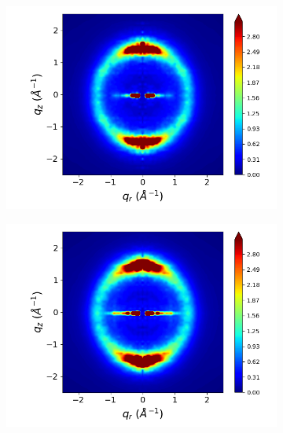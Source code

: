 \documentclass[journal=jpcbfk,manuscript=article]{achemso}
\begin{document}
\begin{figure}[!htb]
  \begin{subfigure}{0.3\linewidth}
  	\centering
  	\includegraphics[width=\textwidth]{rotated_monomers_rzplot_norestraints.png}
  	\caption{}\label{fig:rotated_monomers_rzplot_norestraints}
  \end{subfigure}
  \begin{subfigure}{0.3\linewidth}
  	\centering
  	\includegraphics[width=\textwidth]{staggered_rzplot_norestraints.png} %
  	\caption{}\label{fig:staggered_rzplot_norestraints} 
  \end{subfigure}

\end{figure}
\end{document}
